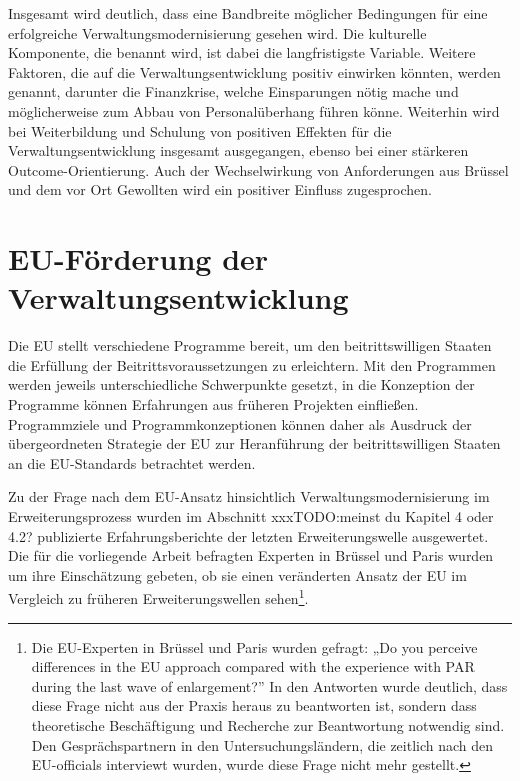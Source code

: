 Insgesamt wird deutlich, dass eine Bandbreite möglicher Bedingungen für eine erfolgreiche Verwaltungsmodernisierung gesehen wird. Die kulturelle Komponente, die benannt wird, ist dabei die langfristigste Variable. Weitere Faktoren, die auf die Verwaltungsentwicklung positiv einwirken könnten, werden genannt, darunter die Finanzkrise, welche Einsparungen nötig mache und möglicherweise zum Abbau von Personalüberhang führen könne. Weiterhin wird bei Weiterbildung und Schulung von positiven Effekten für die Verwaltungsentwicklung insgesamt ausgegangen, ebenso bei einer stärkeren Outcome-Orientierung. Auch der Wechselwirkung von Anforderungen aus Brüssel und dem vor Ort Gewollten wird ein positiver Einfluss zugesprochen.


\section{EU-Förderung der Verwaltungsentwicklung }
Die EU stellt verschiedene Programme bereit, um den beitrittswilligen Staaten die Erfüllung der Beitrittsvoraussetzungen zu erleichtern. Mit den Programmen werden jeweils unterschiedliche Schwerpunkte gesetzt, in die Konzeption der Programme können Erfahrungen aus früheren Projekten einfließen. Programmziele und Programmkonzeptionen können daher als Ausdruck der übergeordneten Strategie der EU zur Heranführung der beitrittswilligen Staaten an die EU-Standards betrachtet werden.\par
Zu der Frage nach dem EU-Ansatz hinsichtlich Verwaltungsmodernisierung im Erweiterungsprozess wurden im Abschnitt xxx{TODO:meinst du Kapitel 4 oder 4.2?} publizierte Erfahrungsberichte der letzten Erweiterungswelle ausgewertet. Die für die vorliegende Arbeit befragten Experten in Brüssel und Paris wurden um ihre Einschätzung gebeten, ob sie einen veränderten Ansatz der EU im Vergleich zu früheren Erweiterungswellen sehen\footnote{Die EU-Experten in Brüssel und Paris wurden gefragt: „Do you perceive differences in the EU approach compared with the experience with PAR during the last wave of enlargement?” In den Antworten wurde deutlich, dass diese Frage nicht aus der Praxis heraus zu beantworten ist, sondern dass theoretische Beschäftigung und Recherche zur Beantwortung notwendig sind. Den Gesprächspartnern in den Untersuchungsländern, die zeitlich nach den EU-officials interviewt wurden, wurde diese Frage nicht mehr gestellt.}.


